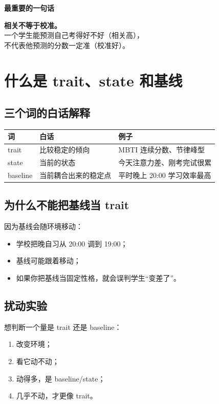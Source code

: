 \documentclass[UTF8,a4paper,11pt]{ctexart}
\newenvironment{explainbox}[1]
{\begin{center}\begin{minipage}{0.94\textwidth}\colorbox{boxbg}{\parbox{0.92\textwidth}{\textbf{#1}\par\vspace{2pt}}}}
{\end{minipage}\end{center}}
\begin{document}
\begin{explainbox}{最重要的一句话}
\textbf{相关不等于校准。}\\
一个学生能预测自己考得好不好（相关高），\\
不代表他预测的分数一定准（校准好）。
\end{explainbox}


\section{什么是 trait、state 和基线}

\subsection{三个词的白话解释}

\begin{center}
\begin{longtable}{@{}p{2.4cm}p{4.2cm}p{7.0cm}@{}}
\toprule
\textbf{词} & \textbf{白话} & \textbf{例子} \\
\midrule
trait & 比较稳定的倾向 & MBTI 连续分数、节律峰型 \\
state & 当前的状态 & 今天注意力差、刚考完试很累 \\
baseline & 当前耦合出来的稳定点 & 平时晚上 20:00 学习效率最高 \\
\bottomrule
\end{longtable}
\end{center}

\subsection{为什么不能把基线当 trait}

因为基线会随环境移动：

\begin{itemize}[leftmargin=2em]
\item 学校把晚自习从 20:00 调到 19:00；
\item 基线可能跟着移动；
\item 如果你把基线当固定性格，就会误判学生“变差了”。
\end{itemize}

\subsection{扰动实验}

想判断一个量是 trait 还是 baseline：

\begin{enumerate}[leftmargin=2em]
\item 改变环境；
\item 看它动不动；
\item 动得多，是 baseline/state；
\item 几乎不动，才更像 trait。
\end{enumerate}
\end{document}
